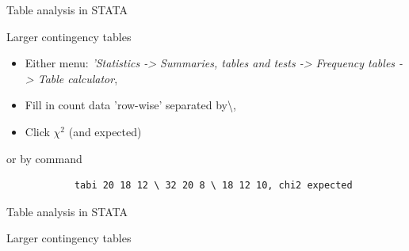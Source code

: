 \documentclass[compress, notes=hide]{beamer}
\begin{document}
\begin{frame}[fragile]{Table analysis in STATA}
	\begin{block}{Larger contingency tables}
			\begin{itemize}
			\item Either menu: \emph{'Statistics -> Summaries, tables and tests -> Frequency tables -> Table calculator},
			\item Fill in count data 'row-wise' separated by\textbackslash, 
			\item Click $\chi^2$ (and expected)
		\end{itemize}
		or by command
		\begin{verbatim}
			tabi 20 18 12 \ 32 20 8 \ 18 12 10, chi2 expected
		\end{verbatim}
	\end{block}

\end{frame}


\begin{frame}[fragile]{Table analysis in STATA}
	\begin{block}{Larger contingency tables}
		
		\begin{figure}[H]
			\begin{center}
				{}
			\end{center}
		\end{figure}
		
	\end{block}
\end{frame}
\end{document}
